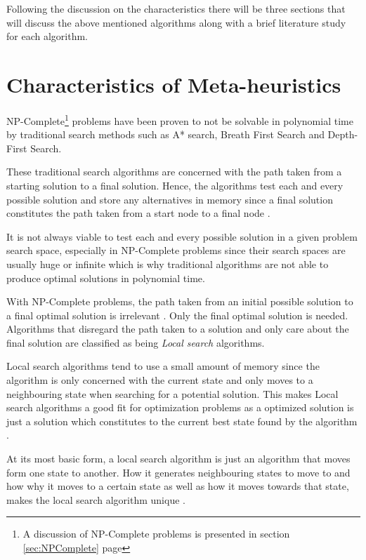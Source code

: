 Following the discussion on the characteristics there will be three sections that will discuss the above mentioned algorithms along with a brief literature study for each algorithm. 

\section{Characteristics of Meta-heuristics}
NP-Complete\footnote{A discussion of NP-Complete problems is presented in section \ref{sec:NPComplete} page \pageref{sec:NPComplete}} problems have been proven to not be solvable in polynomial time by traditional search methods such as A* search, Breath First Search and Depth-First Search\cite{AIModernApproach}. 

These traditional search algorithms are concerned with the path taken from a starting solution to a final solution. Hence, the algorithms test each and every possible solution and store any alternatives in memory since a final solution constitutes the path taken from a start node to a final node \cite{AIModernApproach}.

It is not always viable to test each and every possible solution in a given problem search space, especially in NP-Complete problems since their search spaces are usually huge or infinite which is why traditional algorithms are not able to produce optimal solutions in polynomial time\cite{AIModernApproach}.

With NP-Complete problems, the path taken from an initial possible solution to a final optimal solution is irrelevant \cite{AIModernApproach}. Only the final optimal solution is needed. Algorithms that disregard the path taken to a solution and only care about the final solution are classified as being \emph{Local search} algorithms\cite{AIModernApproach}.

Local search algorithms tend to use a small amount of memory since the algorithm is only concerned with the current state and only moves to a neighbouring state when searching for a potential solution. This makes Local search algorithms a good fit for optimization problems as a optimized solution is just a solution which constitutes to the current best state found by the algorithm \cite{AIModernApproach,NonlinearGlobalTabu}. 

At its most basic form, a local search algorithm is just an algorithm that moves form one state to another. How it generates neighbouring states to move to and how why it moves to a certain state as well as how it moves towards that state, makes the local search algorithm unique \cite{AIModernApproach,CompuIntelligenceIntro,NonlinearGlobalTabu}.

